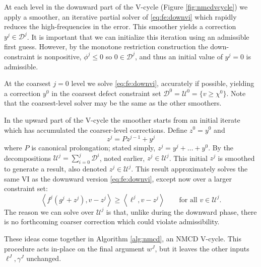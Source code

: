 \documentclass[letterpaper,final,12pt,reqno]{amsart}
\theoremstyle{cstyle}
\theoremstyle{cstyle*}
\theoremstyle{dstyle}
\numberwithin{equation}{section}
\numberwithin{figure}{section}
\numberwithin{table}{section}
\numberwithin{theorem}{section}
\newcommand{\ip}[2]{\left<#1,#2\right>}
\begin{document}
At each level in the downward part of the V-cycle (Figure \ref{fig:nmcdvcycle}) we apply a smoother, an iterative partial solver of \eqref{eq:fe:downvi} which rapidly reduces the high-frequencies in the error.  This smoother yields a correction $y^j \in \mathcal{D}^j$.  It is important that we can initialize this iteration using an admissible first guess.  However, by the monotone restriction construction the down-constraint is nonpositive, $\phi^j\le 0$ so $0\in \mathcal{D}^j$, and thus an initial value of $y^j=0$ is admissible.

At the coarsest $j=0$ level we solve \eqref{eq:fe:downvi}, accurately if possible, yielding a correction $y^0$ in the coarsest defect constraint set $\mathcal{D}^0=\mathcal{U}^0 = \{v \ge \chi^0\}$.  Note that the coarsest-level solver may be the same as the other smoothers.

In the upward part of the V-cycle the smoother starts from an initial iterate which has accumulated the coarser-level corrections.  Define $z^0 = y^0$ and
\begin{equation}
z^j = P z^{j-1} + y^j  \label{eq:fe:upwardaccumulation}
\end{equation}
where $P$ is canonical prolongation; stated simply, $z^j = y^j + \dots + y^0$.  By the decompositions $\mathcal{U}^j = \sum_{i=0}^j \mathcal{D}^i$, noted earlier, $z^j \in \mathcal{U}^j$.  This initial $z^j$ is smoothed to generate a result, also denoted $z^j \in \mathcal{U}^j$.  This result approximately solves the same VI as the downward version \eqref{eq:fe:downvi}, except now over a larger constraint set:
\begin{equation}
\ip{f^j(g^j + z^j)}{v-z^j} \ge \ip{\ell^j}{v-z^j} \qquad \text{for all } v\in \mathcal{U}^j. \label{eq:fe:upvi}
\end{equation}
The reason we can solve over $\mathcal{U}^j$ is that, unlike during the downward phase, there is no forthcoming coarser correction which could violate admissibility.

These ideas come together in Algorithm \ref{alg:nmcd}, an NMCD V-cycle.  This procedure acts in-place on the final argument $w^J$, but it leaves the other inputs $\ell^J,\gamma^J$ unchanged.
\end{document}
